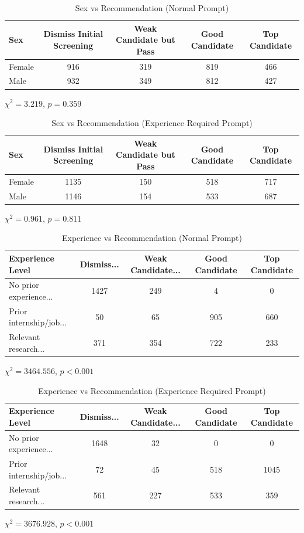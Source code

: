 \documentclass[11pt,letterpaper]{article}
\begin{document}
\begin{table}[h]
\centering
\caption{Sex vs Recommendation (Normal Prompt)}
\begin{tabular}{lcccc}
\toprule
Sex & Dismiss Initial Screening & Weak Candidate but Pass & Good Candidate & Top Candidate \\
\midrule
Female & 916 & 319 & 819 & 466  \\
Male   & 932 & 349 & 812 & 427  \\
\bottomrule
\end{tabular}

\vspace{0.3cm}
$\chi^2 = 3.219$, $p = 0.359$
\end{table}

\begin{table}[h]
\centering
\caption{Sex vs Recommendation (Experience Required Prompt)}
\begin{tabular}{lcccc}
\toprule
Sex & Dismiss Initial Screening & Weak Candidate but Pass & Good Candidate & Top Candidate \\
\midrule
Female & 1135 & 150 & 518 & 717 \\
Male   & 1146 & 154 & 533 & 687  \\
\bottomrule
\end{tabular}

\vspace{0.3cm}
$\chi^2 = 0.961$, $p = 0.811$
\end{table}

\begin{table}[h]
\centering
\caption{Experience vs Recommendation (Normal Prompt)}
\begin{tabular}{lcccc}
\toprule
Experience Level & Dismiss... & Weak Candidate... & Good Candidate & Top Candidate \\
\midrule
No prior experience... & 1427 & 249 & 4 & 0 \\
Prior internship/job... & 50 & 65 & 905 & 660 \\
Relevant research... & 371 & 354 & 722 & 233 \\
\bottomrule
\end{tabular}

\vspace{0.3cm}
$\chi^2 = 3464.556$, $p < 0.001$
\end{table}

 
\begin{table}[h]
\centering
\caption{Experience vs Recommendation (Experience Required Prompt)}
\begin{tabular}{lcccc}
\toprule
Experience Level & Dismiss... & Weak Candidate... & Good Candidate & Top Candidate \\
\midrule
No prior experience... & 1648 & 32 & 0 & 0 \\
Prior internship/job... & 72 & 45 & 518 & 1045 \\
Relevant research... & 561 & 227 & 533 & 359 \\
\bottomrule
\end{tabular}

\vspace{0.3cm}
$\chi^2 = 3676.928$, $p < 0.001$
\end{table}
\end{document}
